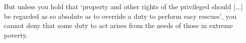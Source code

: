 \documentclass[12pt]{extarticle}
\begin{document}
\begin{multicols*}{3}
But unless you hold that
‘property and other rights of the privileged should [...] be regarded as so absolute as to override a duty to perform easy rescues’, 
you cannot deny that some duty to act arises from the needs of those in extreme poverty.

\columnbreak

\ 
\columnbreak

\ 


\vfill

\footnotesize


\end{multicols*}
\end{document}

